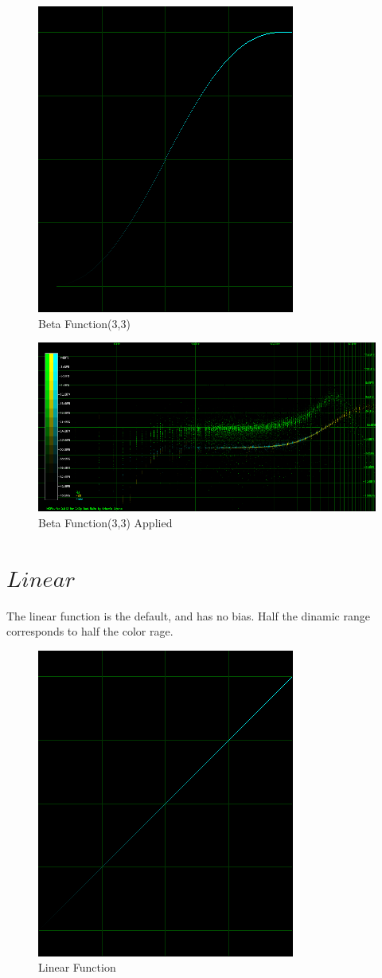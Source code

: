 \documentclass[10pt,a4paper]{report}
\begin{document}
\begin{appendices}
\begin{figure}[H]
	\centering
	\includegraphics[width=0.4\linewidth]{images/colorfilter/BetaFunctionPlot_2.png}
	\caption[Beta Function(3,3)]{Beta Function(3,3)}
	\label{fig:betafunctionplot2}
\end{figure}

\begin{figure}[H]
	\centering
	\includegraphics[width=1\linewidth]{images/colorfilter/BetaFunctionPlot_2_Data.png}
	\caption[Beta Function(3,3)]{Beta Function(3,3) Applied}
	\label{fig:betafunctionplot2data}
\end{figure}

\section{$Linear$} 

The linear function is the default, and has no bias. Half the dinamic range corresponds to half the color rage.

\begin{figure}[H]
	\centering
	\includegraphics[width=0.4\linewidth]{images/colorfilter/BetaFunctionPlot_3.png}
	\caption[Linear]{Linear Function}
	\label{fig:betafunctionplot3}
\end{figure}


\end{appendices}
\end{document}
